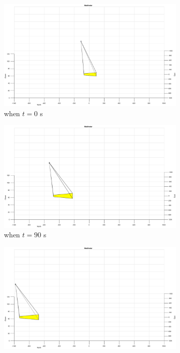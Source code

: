 \begin{figure}[htbp]
	\centering
	\begin{subfigure}[t]{0.32\linewidth}
		\includegraphics[width=\textwidth]{images/chapter4/inertial_UAV_-5mps}
		\caption{when $t=0$ s}
	\end{subfigure}
	\begin{subfigure}[t]{0.32\linewidth}
		\includegraphics[width=\textwidth]{images/chapter4/inertial_UAV_-5mps_90s}
		\caption{when $t=90$ s}
	\end{subfigure}
	\begin{subfigure}[t]{0.32\linewidth}
		\includegraphics[width=\textwidth]{images/chapter4/inertial_UAV_-5mps_180s}

\end{subfigure}
\end{figure}
